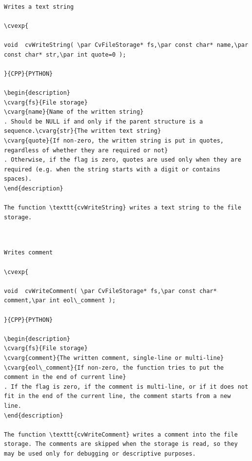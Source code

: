 \label{WriteString}
\begin{verbatim}

Writes a text string

\cvexp{

void  cvWriteString( \par CvFileStorage* fs,\par const char* name,\par const char* str,\par int quote=0 );

}{CPP}{PYTHON}

\begin{description}
\cvarg{fs}{File storage}
\cvarg{name}{Name of the written string}
. Should be NULL if and only if the parent structure is a sequence.\cvarg{str}{The written text string}
\cvarg{quote}{If non-zero, the written string is put in quotes, regardless of whether they are required or not}
. Otherwise, if the flag is zero, quotes are used only when they are required (e.g. when the string starts with a digit or contains spaces).
\end{description}

The function \texttt{cvWriteString} writes a text string to the file storage.


\end{verbatim}
\label{WriteComment}
\begin{verbatim}

Writes comment

\cvexp{

void  cvWriteComment( \par CvFileStorage* fs,\par const char* comment,\par int eol\_comment );

}{CPP}{PYTHON}

\begin{description}
\cvarg{fs}{File storage}
\cvarg{comment}{The written comment, single-line or multi-line}
\cvarg{eol\_comment}{If non-zero, the function tries to put the comment in the end of current line}
. If the flag is zero, if the comment is multi-line, or if it does not fit in the end of the current line, the comment starts from a new line.
\end{description}

The function \texttt{cvWriteComment} writes a comment into the file storage. The comments are skipped when the storage is read, so they may be used only for debugging or descriptive purposes.


\end{verbatim}
